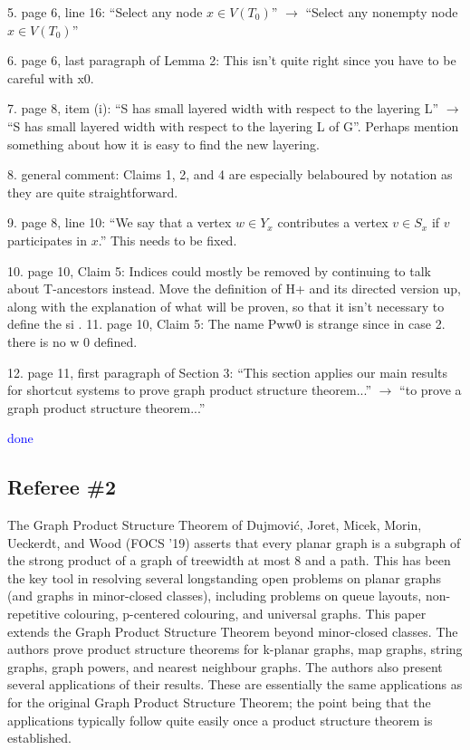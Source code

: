 \documentclass[12pt]{article}
\begin{document}
5. page 6, line 16: “Select any node $x \in V (T_0)$” $\longrightarrow$ “Select any nonempty node $x \in V (T_0)$”

6. page 6, last paragraph of Lemma 2: This isn’t quite right since you
have to be careful with x0.

7. page 8, item (i): “S has small layered width with respect to the layering
L” $\longrightarrow$ “S has small layered width with respect to the layering L of
G”. Perhaps mention something about how it is easy to find the new
layering.

8. general comment: Claims 1, 2, and 4 are especially belaboured by
notation as they are quite straightforward.

9. page 8, line 10: “We say that a vertex $w \in Y_x$ contributes a vertex
$v \in S_x$ if $v$ participates in $x$.” This needs to be fixed.

10. page 10, Claim 5: Indices could mostly be removed by continuing
to talk about T-ancestors instead. Move the definition of H+ and its
directed version up, along with the explanation of what will be proven,
so that it isn’t necessary to define the si
.
11. page 10, Claim 5: The name Pww0 is strange since in case 2. there is
no w 0 defined.

12. page 11, first paragraph of Section 3: “This section applies our main results for shortcut systems to prove graph product structure theorem...” $\longrightarrow$ “to prove a graph product structure theorem...”

\textcolor{blue}{done}

\subsection*{Referee \#2}

The Graph Product Structure Theorem of Dujmović, Joret,
Micek, Morin, Ueckerdt, and Wood (FOCS '19) asserts that every planar
graph is a subgraph of the strong product of a graph of treewidth at
most 8 and a path.  This has been the key tool in resolving several
longstanding open problems on planar graphs (and graphs in
minor-closed classes), including problems on queue layouts,
non-repetitive colouring, p-centered colouring, and universal graphs.
This paper extends the Graph Product Structure Theorem beyond
minor-closed classes.  The authors prove product structure theorems
for k-planar graphs, map graphs, string graphs, graph powers, and
nearest neighbour graphs.   The authors also present several
applications of their results.  These are essentially the same
applications as for the original Graph Product Structure Theorem; the
point being that the applications typically follow quite easily once a
product structure theorem is established.
\end{document}
